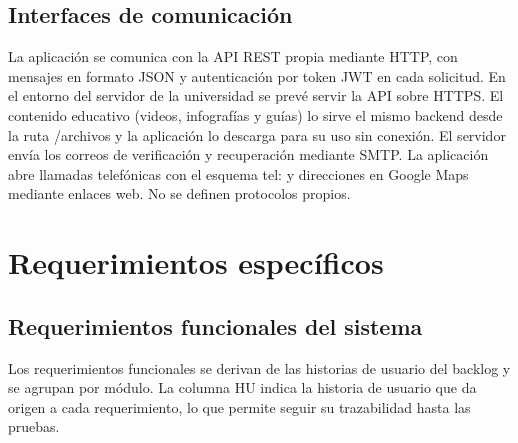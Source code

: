 \subsection{Interfaces de comunicación}

La aplicación se comunica con la API REST propia mediante HTTP, con mensajes en
formato JSON y autenticación por token JWT en cada solicitud. En el entorno del
servidor de la universidad se prevé servir la API sobre HTTPS. El contenido
educativo (videos, infografías y guías) lo sirve el mismo backend desde la ruta
/archivos y la aplicación lo descarga para su uso sin conexión. El
servidor envía los correos de verificación y recuperación mediante SMTP. La
aplicación abre llamadas telefónicas con el esquema tel: y direcciones
en Google Maps mediante enlaces web. No se definen protocolos propios.

\section[Requerimientos Específicos]{Requerimientos específicos}

\subsection[Requerimientos Funcionales del Sistema]{Requerimientos funcionales del sistema}

Los requerimientos funcionales se derivan de las historias de usuario del
backlog y se agrupan por módulo. La columna HU indica la historia de usuario que
da origen a cada requerimiento, lo que permite seguir su trazabilidad hasta las
pruebas.

